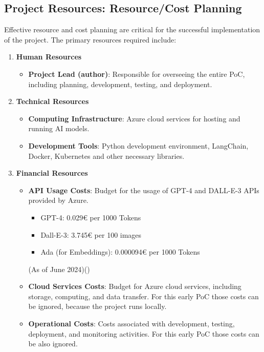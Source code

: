 \documentclass[%
pdftex,
oneside,			%
11pt,				%
parskip=half,		%
headheight = 12pt,	%
headsepline,		%
footsepline,		%
footheight = 16pt,	%
abstracton,		%
DIV=calc,		%
BCOR=8mm,		%
headinclude=false,	%
footinclude=false,	%
listof=totoc,		%
toc=bibliography,	%
]{scrreprt}	%
\begin{document}
        \subsection{Project Resources: Resource/Cost Planning}

            Effective resource and cost planning are critical for the successful implementation of the project. 
            The primary resources required include:

            \begin{enumerate}
                \item \textbf{Human Resources}
                \begin{itemize}
                    \item \textbf{Project Lead (author)}: Responsible for overseeing the entire PoC, including planning, development, testing, and deployment.
                \end{itemize}
                \item \textbf{Technical Resources}
                \begin{itemize}
                    \item \textbf{Computing Infrastructure}: Azure cloud services for hosting and running AI models.
                    \item \textbf{Development Tools}: Python development environment, LangChain, Docker, Kubernetes and other necessary libraries.
                \end{itemize}
                \item \textbf{Financial Resources}
                \begin{itemize}
                    \item \textbf{API Usage Costs}: Budget for the usage of GPT-4 and DALL-E-3 APIs provided by Azure. 
                    \begin{itemize}
                        \item GPT-4: 0.029€ per 1000 Tokens 
                        \item Dall-E-3: 3.745€ per 100 images
                        \item Ada (for Embeddings): 0.000094€ per 1000 Tokens
                    \end{itemize}
                    (As of June 2024)(\cite[Vgl.][]{openai_azure_pricing})
                    \item \textbf{Cloud Services Costs}: Budget for Azure cloud services, including storage, computing, and data transfer. For this early PoC those costs can be ignored, because the project runs locally.
                    \item \textbf{Operational Costs}: Costs associated with development, testing, deployment, and monitoring activities. For this early PoC those costs can be also ignored.
                \end{itemize}
            \end{enumerate}
\end{document}
